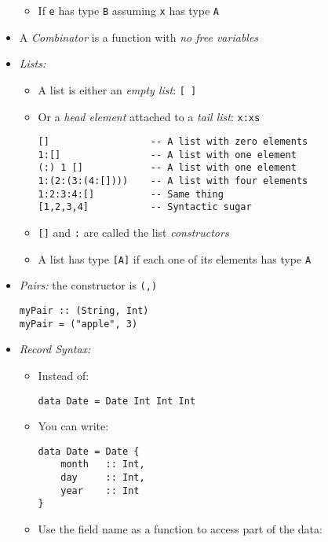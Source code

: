 \documentclass[landscape,8pt]{extarticle}
\newcommand{\code}{\lstinline}
\begin{document}
\begin{multicols}{4}
\begin{itemize}
\begin{itemize}
                  \item If \code{e} has type \code{B} assuming \code{x} has type \code{A}
              \end{itemize}
        \item A \emph{Combinator} is a function with \emph{no free variables}
        \item \emph{Lists:}
              \begin{itemize}
                  \item A list is either an \emph{empty list}: \code{[ ]}
                  \item Or a \emph{head element} attached to a \emph{tail list}: \code{x:xs}
                        \begin{lstlisting}
[]                  -- A list with zero elements
1:[]                -- A list with one element
(:) 1 []            -- A list with one element
1:(2:(3:(4:[])))    -- A list with four elements
1:2:3:4:[]          -- Same thing
[1,2,3,4]           -- Syntactic sugar
               \end{lstlisting}
                  \item \code{[]} and \code{:} are called the list \emph{constructors}
                  \item A list has type \code{[A]} if each one of its elements has type \code{A}
              \end{itemize}
        \item \emph{Pairs:} the constructor is \code{(,)}
              \begin{lstlisting}
myPair :: (String, Int)
myPair = ("apple", 3)
               \end{lstlisting}
        \item \emph{Record Syntax:}
              \begin{itemize}
                  \item Instead of:
                        \begin{lstlisting}
data Date = Date Int Int Int
               \end{lstlisting}
                  \item You can write:
                        \begin{lstlisting}
data Date = Date {
    month   :: Int,
    day     :: Int,
    year    :: Int
}
               \end{lstlisting}
                  \item Use the field name as a function to access part of the data:
                        \begin{lstlisting}

\end{lstlisting}
\end{itemize}
\end{itemize}
\end{multicols}
\end{document}
